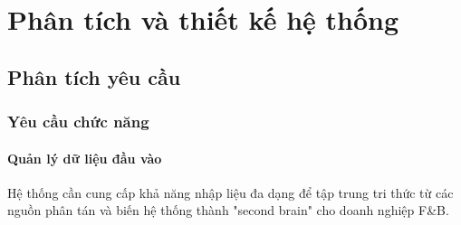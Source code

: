 \chapter{Phân tích và thiết kế hệ
thống}\label{phuxe2n-tuxedch-vuxe0-thiux1ebft-kux1ebf-hux1ec7-thux1ed1ng}

\section{Phân tích yêu cầu}\label{phuxe2n-tuxedch-yuxeau-cux1ea7u}

\subsection{Yêu cầu chức
năng}\label{yuxeau-cux1ea7u-chux1ee9c-nux103ng}

\subsubsection{Quản lý dữ liệu đầu
vào}\label{quux1ea3n-luxfd-dux1eef-liux1ec7u-ux111ux1ea7u-vuxe0o}

Hệ thống cần cung cấp khả năng nhập liệu đa dạng để tập trung tri thức
từ các nguồn phân tán và biến hệ thống thành "second brain" cho doanh
nghiệp F\&B.

